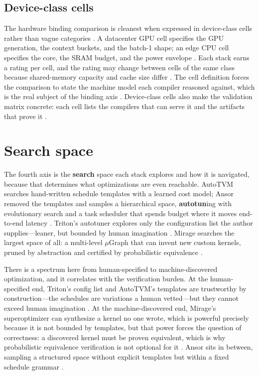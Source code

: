 \subsection{Device-class cells}

The hardware binding comparison is cleanest when expressed in device-class cells rather than vague categories \citep{patel2025llminference,memoryfloor2026}. A datacenter GPU cell specifies the GPU generation, the context buckets, and the batch-1 shape; an edge CPU cell specifies the core, the SRAM budget, and the power envelope \citep{nvidia2022hopper,dlbook,amd2024aie}. Each stack earns a rating per cell, and the rating may change between cells of the same class because shared-memory capacity and cache size differ \citep{chen2020compilerbasedhardw,memoryfloor2026}. The cell definition forces the comparison to state the machine model each compiler reasoned against, which is the real subject of the binding axis \citep{wu2024mirage,iree2024}. Device-class cells also make the validation matrix concrete: each cell lists the compilers that can serve it and the artifacts that prove it \citep{taxbreak2026,memoryfloor2026}.

\section{Search space}
\label{sec:ch21_search_space}

The fourth axis is the \textbf{search} space each stack explores and how it is navigated, because that determines what optimizations are even reachable. AutoTVM searches hand-written schedule templates with a learned cost model; Ansor removed the templates and samples a hierarchical space, \textbf{autotun}ing with evolutionary search and a task scheduler that spends budget where it moves end-to-end latency \citep{chen2018autotvm,zheng2020ansor}. Triton's autotuner explores only the configuration list the author supplies---leaner, but bounded by human imagination \citep{tritonlang2024}. Mirage searches the largest space of all: a multi-level $\mu$Graph that can invent new custom kernels, pruned by abstraction and certified by probabilistic equivalence \citep{wu2024mirage}.

There is a spectrum here from human-specified to machine-discovered optimization, and it correlates with the verification burden. At the human-specified end, Triton's config list and AutoTVM's templates are trustworthy by construction---the schedules are variations a human vetted---but they cannot exceed human imagination \citep{tritonlang2024,chen2018autotvm}. At the machine-discovered end, Mirage's superoptimizer can synthesize a kernel no one wrote, which is powerful precisely because it is not bounded by templates, but that power forces the question of correctness: a discovered kernel must be proven equivalent, which is why probabilistic equivalence verification is not optional for it \citep{wu2024mirage}. Ansor sits in between, sampling a structured space without explicit templates but within a fixed schedule grammar \citep{zheng2020ansor}.

